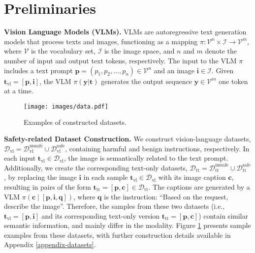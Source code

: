 \section{Preliminaries} 

\textbf{Vision Language Models (VLMs).} 
VLMs are autoregressive text generation models that process texts and images, functioning as a mapping $\pi: \mathcal{V}^n  \times \mathcal{I} \rightarrow \mathcal{V}^m$, where $\mathcal{V}$ is the vocabulary set, $\mathcal{I}$ is the image space, and $n$ and $m$ denote the number of input and output text tokens, respectively. The input to the VLM $\pi$ includes a text prompt $\mathbf{p} = (p_1, p_2, \dots, p_n) \in \mathcal{V}^n$ and an image $\mathbf{i} \in \mathcal{I}$. Given $\mathbf{t}_\text{vl} = [\mathbf{p}, \mathbf{i}]$, the VLM $\pi(\mathbf{y} | \mathbf{t})$ generates the output sequence $\mathbf{y} \in \mathcal{V}^m$ one token at a time.

\begin{figure}[t] 
\begin{center}
    \texttt{[image: images/data.pdf]}
\end{center}
\vspace{-10pt}
\caption{Examples of constructed datasets.}
\vspace{-10pt}
\label{fig:data}
\end{figure}

\textbf{Safety-related Dataset Construction.} We construct vision-language datasets, $\mathcal{D}_{\text{vl}} =  \mathcal{D}^{\text{unsafe}}_\text{vl}\cup \mathcal{D}^{\text{safe}}_\text{vl}$, containing harmful and benign instructions, respectively. In each input $\mathbf{t}_\text{vl} \in \mathcal{D}_{\text{vl}}$, the image is semantically related to the text prompt. Additionally, we create the corresponding text-only datasets, $\mathcal{D}_{\text{tt}} = \mathcal{D}^{\text{unsafe}}_\text{tt} \cup\mathcal{D}^{\text{safe}}_\text{tt}$, by replacing the image $\mathbf{i}$ in each sample $\mathbf{t}_{\text{vl}} \in \mathcal{D}_{\text{vl}}$ with its image caption $\mathbf{c}$, resulting in pairs of the form $\mathbf{t}_\text{tt} = [\mathbf{p}, \mathbf{c}] \in \mathcal{D}_{\text{tt}}$. The captions are generated by a VLM $\pi(\mathbf{c} \mid [\mathbf{p}, \mathbf{i}, \mathbf{q}])$, where $\mathbf{q}$ is the instruction: “Based on the request, describe the image”. Therefore, the samples from these two datasets (i.e., $\mathbf{t}_\text{vl}=[\mathbf{p}, \mathbf{i}]$ and its corresponding text-only version $\mathbf{t}_{\text{tt}} =[\mathbf{p}, \mathbf{c}]$) contain similar semantic information, and mainly differ in the modality. Figure \ref{fig:data} presents sample examples from these datasets, with further construction details available in Appendix \ref{appendix-datasets}.

